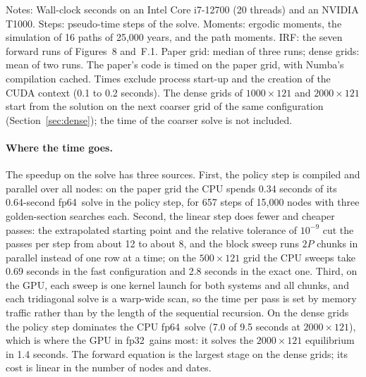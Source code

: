 \documentclass[11pt]{article}
\newcommand{\fpd}{\textsf{fp64}}
\newcommand{\fps}{\textsf{fp32}}
\begin{document}
\begin{table}[htbp]
\centering
\caption{Run time by stage, in seconds, and speedup over the paper's code}
\label{tab:times}
\footnotesize
{}
\par\smallskip\begin{minipage}{\textwidth}\footnotesize Notes: Wall-clock seconds on an Intel Core i7-12700 (20 threads) and an NVIDIA T1000. Steps: pseudo-time steps of the solve. Moments: ergodic moments, the simulation of 16 paths of 25{,}000 years, and the path moments. IRF: the seven forward runs of Figures~8 and~F.1. Paper grid: median of three runs; dense grids: mean of two runs. The paper's code is timed on the paper grid, with Numba's compilation cached. Times exclude process start-up and the creation of the CUDA context (0.1 to 0.2 seconds). The dense grids of $1000\times121$ and $2000\times121$ start from the solution on the next coarser grid of the same configuration (Section~\ref{sec:dense}); the time of the coarser solve is not included.
\end{minipage}
\end{table}

\paragraph{Where the time goes.} The speedup on the solve has three sources. First, the policy step is compiled and parallel over all nodes: on the paper grid the CPU spends 0.34 seconds of its 0.64-second \fpd\ solve in the policy step, for 657 steps of 15{,}000 nodes with three golden-section searches each. Second, the linear step does fewer and cheaper passes: the extrapolated starting point and the relative tolerance of $10^{-9}$ cut the passes per step from about 12 to about 8, and the block sweep runs $2P$ chunks in parallel instead of one row at a time; on the $500\times121$ grid the CPU sweeps take 0.69 seconds in the fast configuration and 2.8 seconds in the exact one. Third, on the GPU, each sweep is one kernel launch for both systems and all chunks, and each tridiagonal solve is a warp-wide scan, so the time per pass is set by memory traffic rather than by the length of the sequential recursion. On the dense grids the policy step dominates the CPU \fpd\ solve (7.0 of 9.5 seconds at $2000\times121$), which is where the GPU in \fps\ gains most: it solves the $2000\times121$ equilibrium in 1.4 seconds. The forward equation is the largest stage on the dense grids; its cost is linear in the number of nodes and dates.
\end{document}
